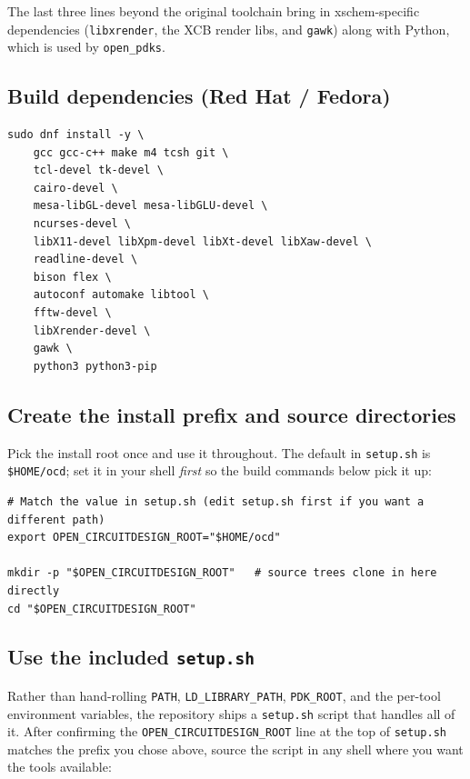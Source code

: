 \documentclass[11pt]{article}
\begin{document}
\noindent The last three lines beyond the original toolchain bring in
xschem-specific dependencies (\texttt{libxrender}, the XCB render libs, and
\texttt{gawk}) along with Python, which is used by \texttt{open\_pdks}.

\subsection{Build dependencies (Red Hat / Fedora)}

\begin{lstlisting}
sudo dnf install -y \
    gcc gcc-c++ make m4 tcsh git \
    tcl-devel tk-devel \
    cairo-devel \
    mesa-libGL-devel mesa-libGLU-devel \
    ncurses-devel \
    libX11-devel libXpm-devel libXt-devel libXaw-devel \
    readline-devel \
    bison flex \
    autoconf automake libtool \
    fftw-devel \
    libXrender-devel \
    gawk \
    python3 python3-pip
\end{lstlisting}

\subsection{Create the install prefix and source directories}

Pick the install root once and use it throughout. The default in
\texttt{setup.sh} is \texttt{\$HOME/ocd}; set it in your shell
\emph{first} so the build commands below pick it up:

\begin{lstlisting}
# Match the value in setup.sh (edit setup.sh first if you want a different path)
export OPEN_CIRCUITDESIGN_ROOT="$HOME/ocd"

mkdir -p "$OPEN_CIRCUITDESIGN_ROOT"   # source trees clone in here directly
cd "$OPEN_CIRCUITDESIGN_ROOT"
\end{lstlisting}

\subsection{Use the included \texttt{setup.sh}}

Rather than hand-rolling \texttt{PATH}, \texttt{LD\_LIBRARY\_PATH},
\texttt{PDK\_ROOT}, and the per-tool environment variables, the repository
ships a \texttt{setup.sh} script that handles all of it. After confirming
the \texttt{OPEN\_CIRCUITDESIGN\_ROOT} line at the top of \texttt{setup.sh}
matches the prefix you chose above, source the script in any shell where
you want the tools available:
\end{document}
